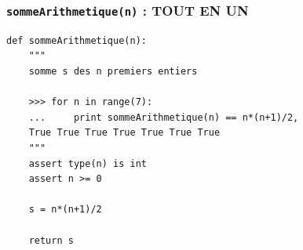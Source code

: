 \begin{frame}[containsverbatim]
\frametitle{{\tt sommeArithmetique(n)} \uppercase{: tout en un}}
\footnotesize
\begin{lstlisting}
def sommeArithmetique(n):
    """
    somme s des n premiers entiers
    
    >>> for n in range(7):
    ...     print sommeArithmetique(n) == n*(n+1)/2,
    True True True True True True True
    """
    assert type(n) is int
    assert n >= 0

    s = n*(n+1)/2
    
    return s
\end{lstlisting}

\end{frame}

